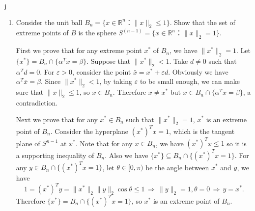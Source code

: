 j\documentclass[11pt]{article}
\institute{\'Ecole Polytechnique F\'ed\'erale de Lausanne}
\newcommand{\setR}{\mathbb{R}}
\renewcommand{\leq}{\leqslant}
\begin{document}
\makeheader

\begin{enumerate}[1)]

\item  \label{item:ex-9}
  Consider the unit ball $B_n = \{ x ∈ ℝ^n ： \|x\|_2≤1\}$. Show that the set of extreme points of $B$ is the sphere $S^{(n-1)} = \{ x ∈ ℝ^n ： \|x\|_2 =1\}$.
  
  \begin{solution}
  First we prove that for any extreme point $x^*$ of $B_n$, we have $\|x^*\|_2=1$. Let $\{x^*\} = B_n \cap \{\alpha^T x= \beta\}$. Suppose that $\|x^*\|_2<1$. Take $d\neq 0$ such that $\alpha^T d = 0$. For $\varepsilon> 0$, consider the point $\bar{x} = x^* + \varepsilon d$. Obviously we have $\alpha^T \bar{x} = \beta$. Since $\|x^*\|_2<1$, by taking $\varepsilon$ to be small enough, we can make sure that $\|\bar{x}\|_2\leq 1$, so $\bar{x} \in B_n$. Therefore $\bar{x} \neq x^*$ but $\bar{x} \in B_n \cap \{\alpha^T x= \beta\}$, a contradiction.

  Next we prove that for any $x^* \in B_n$ such that $\|x^*\|_2=1$, $x^*$ is an extreme point of $B_n$. Consider the hyperplane $(x^*)^T x = 1$, which is the tangent plane of $S^{n-1}$ at $x^*$. Note that for any $x \in B_n$, we have $(x^*)^T x \leq 1$ so it is a supporting inequality of $B_n$. Also we have $\{x^*\} \subseteq B_n \cap \{(x^*)^T x = 1\}$. For any $y \in B_n \cap \{(x^*)^T x = 1\}$, let $\theta\in [0,\pi)$ be the angle between $x^*$ and $y$, we have
  \[ 1=(x^*)^T y = \|x^*\|_2 \|y\|_2 \cos\theta \leq 1 \,\Rightarrow\, \|y\|_2 = 1, \theta = 0 \,\Rightarrow\, y = x^*. \]
  Therefore $\{x^*\} = B_n \cap \{(x^*)^T x = 1\}$, so $x^*$ is an extreme point of $B_n$.
  \end{solution}


  




\end{enumerate}
\end{document}
